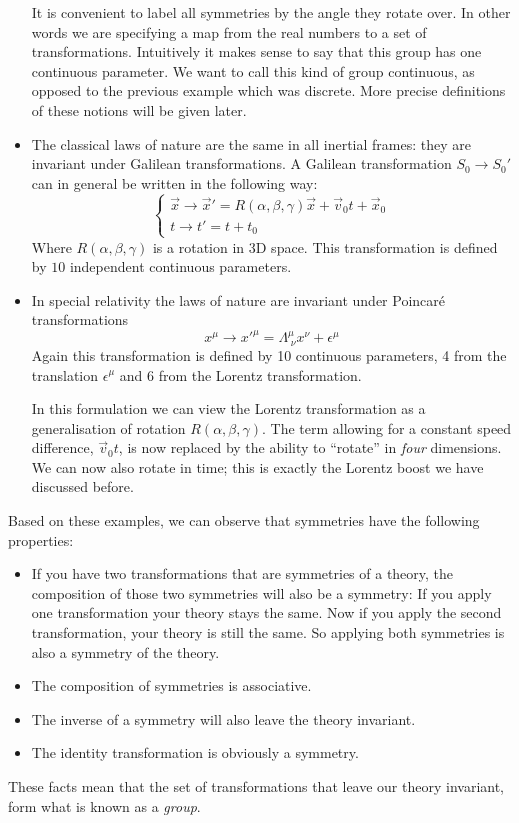 \begin{itemize}
It is convenient to label all symmetries by the angle they rotate over. In other words we are specifying a map from the real numbers to a set of transformations. Intuitively it makes sense to say that this group has one continuous parameter. We want to call this kind of group continuous, as opposed to the previous example which was discrete. More precise definitions of these notions will be given later.
\item The classical laws of nature are the same in all inertial frames: they are invariant under Galilean transformations.
A Galilean transformation $S_0 \rightarrow S_0'$ can in general be written in the following way:
\[ \begin{cases}
\vec{x}\rightarrow \vec{x}' = R(\alpha, \beta, \gamma)\vec{x} + \vec{v}_0t + \vec{x}_0 \\
t \rightarrow t' = t+t_0
\end{cases} \]
Where $R(\alpha, \beta, \gamma)$ is a rotation in 3D space. This transformation is defined by $10$ independent continuous parameters.
\item In special relativity the laws of nature are invariant under Poincaré transformations
\[ x^\mu \rightarrow x'^\mu = \Lambda^\mu_{\;\nu} x^\nu + \epsilon^\mu \]
Again this transformation is defined by 10 continuous parameters, 4 from the translation $\epsilon^\mu$ and 6 from the Lorentz transformation.

In this formulation we can view the Lorentz transformation as a generalisation of rotation $R(\alpha, \beta, \gamma)$. The term allowing for a constant speed difference, $\vec{v}_0t$, is now replaced by the ability to ``rotate'' in \textit{four} dimensions. We can now also rotate in time; this is exactly the Lorentz boost we have discussed before. 
\end{itemize}

Based on these examples, we can observe that symmetries have the following properties:
\begin{itemize}
\item If you have two transformations that are symmetries of a theory, the composition of those two symmetries will also be a symmetry: If you apply one transformation your theory stays the same. Now if you apply the second transformation, your theory is still the same. So applying both symmetries is also a symmetry of the theory.
\item The composition of symmetries is associative.
\item The inverse of a symmetry will also leave the theory invariant.
\item The identity transformation is obviously a symmetry.
\end{itemize}
These facts mean that the set of transformations that leave our theory invariant, form what is known as a \textit{group}.

